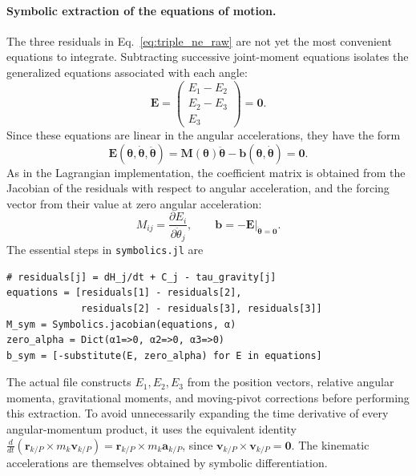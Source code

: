 \paragraph{Symbolic extraction of the equations of motion.}
The three residuals in Eq.~\eqref{eq:triple_ne_raw} are not yet the most
convenient equations to integrate. Subtracting successive joint-moment
equations isolates the generalized equations associated with each angle:
\begin{equation}
    \mathbf E =
    \begin{pmatrix}
        E_1-E_2\\E_2-E_3\\E_3
    \end{pmatrix}=\mathbf 0.
    \label{eq:triple_ne_reduced}
\end{equation}
Since these equations are linear in the angular accelerations, they have the
form
\begin{equation}
    \mathbf E(\boldsymbol\theta,\dot{\boldsymbol\theta},
               \ddot{\boldsymbol\theta})
    =\mathbf M(\boldsymbol\theta)\ddot{\boldsymbol\theta}
    -\mathbf b(\boldsymbol\theta,\dot{\boldsymbol\theta})=\mathbf0.
    \label{eq:triple_ne_affine}
\end{equation}
As in the Lagrangian implementation, the coefficient matrix is obtained from
the Jacobian of the residuals with respect to angular acceleration, and the
forcing vector from their value at zero angular acceleration:
\begin{equation}
    M_{ij}=\frac{\partial E_i}{\partial\ddot\theta_j},
    \qquad
    \mathbf b=-\left.\mathbf E\right|_{\ddot{\boldsymbol\theta}=\mathbf0}.
    \label{eq:triple_ne_extract}
\end{equation}
The essential steps in \texttt{symbolics.jl} are
\begin{verbatim}
# residuals[j] = dH_j/dt + C_j - tau_gravity[j]
equations = [residuals[1] - residuals[2],
             residuals[2] - residuals[3], residuals[3]]
M_sym = Symbolics.jacobian(equations, α)
zero_alpha = Dict(α1=>0, α2=>0, α3=>0)
b_sym = [-substitute(E, zero_alpha) for E in equations]
\end{verbatim}
The actual file constructs $E_1,E_2,E_3$ from the position vectors, relative
angular momenta, gravitational moments, and moving-pivot corrections before
performing this extraction. To avoid unnecessarily expanding the time
derivative of every angular-momentum product, it uses the equivalent identity
$\frac{d}{dt}(\mathbf r_{k/P}\times m_k\mathbf v_{k/P})
=\mathbf r_{k/P}\times m_k\mathbf a_{k/P}$, since
$\mathbf v_{k/P}\times\mathbf v_{k/P}=\mathbf0$. The kinematic accelerations
are themselves obtained by symbolic differentiation.

